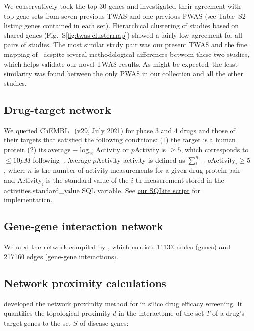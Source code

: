 \documentclass[letterpaper]{article}
\begin{document}
We conservatively took the top 30 genes and investigated their agreement with
top gene sets from seven previous TWAS and one previous PWAS (see Table~S2
listing genes contained in each set).  Hierarchical clustering of studies
based on shared genes (Fig.~S\ref{fig:twas-clustermap}) showed a fairly low
agreement for all pairs of studies.  The most similar study pair was our
present TWAS and the fine mapping of~\cite{Jansen2019} despite several
methodological differences between these two studies, which helps validate our
novel TWAS results.  As might be expected, the least similarity was found
between the only PWAS in our collection and all the other studies.

\subsection{Drug-target network}

We queried ChEMBL~\citep{Gaulton2017} (v29, July 2021) for phase 3 and 4 drugs
and those of their targets that satisfied the following conditions: (1) the
target is a human protein (2) its average $-\log_{10}\mathrm{Activity}$ or
$p\mathrm{Activity}$ is $\ge 5$, which corresponds to $\le 10 \mu M$
following~\cite{Cheng2018}.  Average $p\mathrm{Activity}$ activity is defined
as $\sum_{i=1}^n p\mathrm{Activity}_i \ge 5$, where $n$ is the number of
activity measurements for a given drug-protein pair and $\mathrm{Activity}_i$
is the standard value of the $i$-th measurement stored in the
activities.standard\_value SQL variable.  See
\href{https://github.com/attilagk/CTNS-notebook/blob/main/2021-10-24-chembl-query/drug_target_avg_activity.sql}{our SQLite script} for implementation.

\subsection{Gene-gene interaction network}

We used the network compiled by \cite{Cheng2019}, which consists 11133 nodes
(genes) and 217160 edges (gene-gene interactions).

\subsection{Network proximity calculations}

\cite{Guney2016} developed the network proximity method for in silico drug efficacy screening.  It
quantifies the topological proximity $d$ in the interactome of the set $T$ of a drug's target genes
to the set $S$ of disease genes: 
\end{document}
